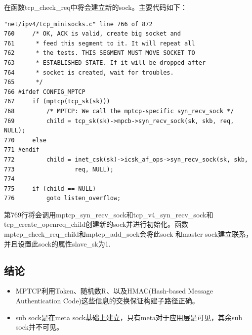 在函数tcp\_check\_req中将会建立新的sock。主要代码如下：
\small\begin{verbatim}
"net/ipv4/tcp_minisocks.c" line 766 of 872
760     /* OK, ACK is valid, create big socket and
761      * feed this segment to it. It will repeat all
762      * the tests. THIS SEGMENT MUST MOVE SOCKET TO
763      * ESTABLISHED STATE. If it will be dropped after
764      * socket is created, wait for troubles.
765      */
766 #ifdef CONFIG_MPTCP
767     if (mptcp(tcp_sk(sk)))
768         /* MPTCP: We call the mptcp-specific syn_recv_sock */
769         child = tcp_sk(sk)->mpcb->syn_recv_sock(sk, skb, req, NULL);
770     else
771 #endif
772         child = inet_csk(sk)->icsk_af_ops->syn_recv_sock(sk, skb,
773                 req, NULL);
774
775     if (child == NULL)
776         goto listen_overflow;
\end{verbatim}\normalsize
第769行将会调用mptcp\_syn\_recv\_sock和tcp\_v4\_syn\_recv\_sock和tcp\_create\_openreq\_child创建新的sock并进行初始化。函数mptcp\_check\_req\_child和mptcp\_add\_sock会将此sock 和master sock建立联系，并且设置此sock的属性slave\_sk为1.
\subsection{结论}
\begin{itemize}
  \item MPTCP利用Token、随机数R、以及HMAC(Hash-based Message Authentication Code)这些信息的交换保证构建子路径正确。
  \item sub sock是在meta sock基础上建立，只有meta对于应用层是可见，其余sub sock并不可见。
\end{itemize}